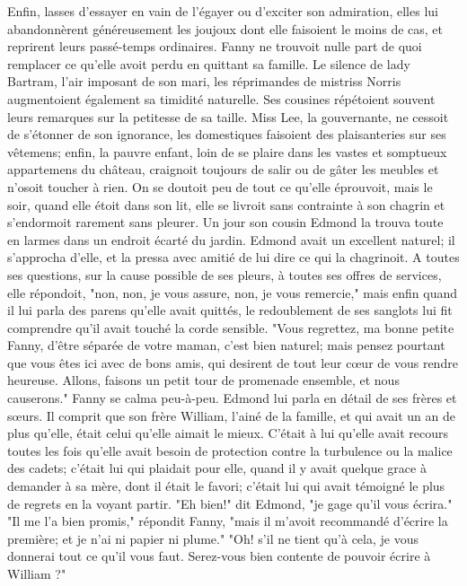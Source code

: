 Enfin, lasses d'essayer en vain de l'égayer ou d'exciter son admiration, elles lui abandonnèrent généreusement les joujoux dont elle faisoient le moins de cas, et reprirent leurs passé-temps ordinaires.
Fanny ne trouvoit nulle part de quoi remplacer ce qu'elle avoit perdu en quittant sa famille. Le silence de lady Bartram, l'air imposant de son mari, les réprimandes de mistriss Norris augmentoient également sa timidité naturelle. Ses cousines répétoient souvent leurs remarques sur la petitesse de sa taille. Miss Lee, la gouvernante, ne cessoit de s'étonner de son ignorance, les domestiques faisoient des plaisanteries sur ses vêtemens; enfin, la pauvre enfant, loin de se plaire dans les vastes et somptueux appartemens du château, craignoit toujours de salir ou de gâter les meubles et n'osoit toucher à rien. On se doutoit peu de tout ce qu'elle éprouvoit, mais le soir, quand elle étoit dans son lit, elle se livroit sans contrainte à son chagrin et s'endormoit rarement sans pleurer.
Un jour son cousin Edmond la trouva toute en larmes dans un endroit écarté du jardin.\setcounter{page}{498} Edmond avait un excellent naturel; il s'approcha d'elle, et la pressa avec amitié de lui dire ce qui la chagrinoit. A toutes ses questions, sur la cause possible de ses pleurs, à toutes ses offres de services, elle répondoit, "non, non, je vous assure, non, je vous remercie," mais enfin quand il lui parla des parens qu'elle avait quittés, le redoublement de ses sanglots lui fit comprendre qu'il avait touché la corde sensible. "Vous regrettez, ma bonne petite Fanny, d'être séparée de votre maman, c'est bien naturel; mais pensez pourtant que vous êtes ici avec de bons amis, qui desirent de tout leur cœur de vous rendre heureuse. Allons, faisons un petit tour de promenade ensemble, et nous causerons." Fanny se calma peu-à-peu. Edmond lui parla en détail de ses frères et sœurs. Il comprit que son frère William, l'ainé de la famille, et qui avait un an de plus qu'elle, était celui qu'elle aimait le mieux. C'était à lui qu'elle avait recours toutes les fois qu'elle avait besoin de protection contre la turbulence ou la malice des cadets; c'était lui qui plaidait pour elle, quand il y avait quelque grace à demander à sa mère, dont il était le favori; c'était lui qui avait témoigné le plus de regrets en la voyant partir.\setcounter{page}{499}
"Eh bien!" dit Edmond, "je gage qu’il vous écrira."
"Il me l’a bien promis," répondit Fanny, "mais il m’avoit recommandé d’écrire la première; et je n’ai ni papier ni plume."
"Oh! s’il ne tient qu’à cela, je vous donnerai tout ce qu’il vous faut. Serez-vous bien contente de pouvoir écrire à William ?"
